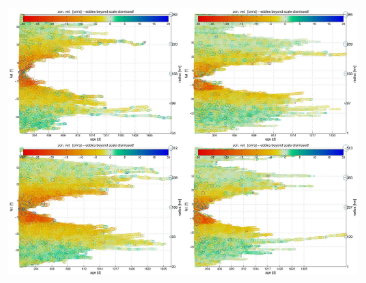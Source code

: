 \documentclass{beamer}
\begin{document}
\begin{frame}
\begin{figure}
	\centering
	\includegraphics[height=200pt,keepaspectratio=true]{scAP.pdf}
\end{figure}
\end{frame}


\begin{frame}

%


\end{frame}
\end{document}
